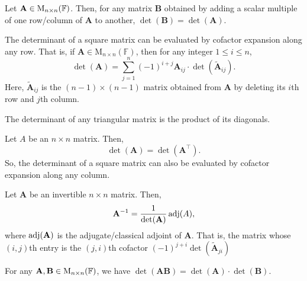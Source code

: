 \begin{corollary}{}{}
    Let \(\mathbf{A}\in\operatorname{M}_{n \times n}(\mathbb{F})\). Then, for any matrix \(\mathbf{B}\) obtained by adding a scalar multiple of one row/column of \(\mathbf{A}\) to another, \(\det(\mathbf{B})=\det(\mathbf{A})\).
\end{corollary}
\begin{theorem}{}{}
    The determinant of a square matrix can be evaluated by cofactor expansion along any row. That is, if \(\mathbf{A} \in \mathrm{M}_{n\times n}(\mathbb{F})\), then for any integer \(1\leq i\leq n\),
        \[\det(\mathbf{A})=\sum_{j=1}^{n}{(-1)}^{i+j}\mathbf{A}_{ij}\cdot \det(\widetilde{\mathbf{A}}_{ij}).\] 
        Here, \(\widetilde{\mathbf{A}}_{ij}\) is the \((n-1)\times(n-1)\) matrix obtained from \(\mathbf{A}\) by deleting its \(i\)th row and \(j\)th column.
\end{theorem}
\begin{corollary}{}{}
    The determinant of any triangular matrix is the product of its diagonals.
\end{corollary}
\begin{theorem}{}{}
    Let \(A\) be an \(n\times n\) matrix. Then,
    \[\det(\mathbf{A})=\det(\mathbf{A}^\top).\]
    So, the determinant of a square matrix can also be evaluated by cofactor expansion along any column.
\end{theorem}
\begin{theorem}{}{}
    Let \(\mathbf{A}\) be an invertible \(n\times n\) matrix. Then,
    \[\mathbf{A}^{-1}=\frac{1}{\det(\mathbf{A})}\operatorname{adj}(A),\]
    where \(\operatorname{adj}(\mathbf{A})\) is the adjugate/classical adjoint of \(\mathbf{A}\). That is, the matrix whose \((i,j)\)th entry is the \((j,i)\)th cofactor \((-1)^{j+i}\det(\widetilde{\mathbf{A}}_{ji})\)
\end{theorem}
\begin{theorem}{}{}
    For any \(\mathbf{A},\mathbf{B} \in\operatorname{M}_{n \times n}(\mathbb{F})\), we have \(\det(\mathbf{A}\mathbf{B})=\det(\mathbf{A})\cdot\det(\mathbf{B})\).
\end{theorem}
